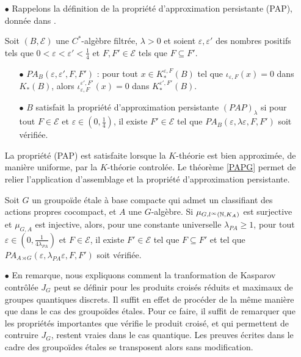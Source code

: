 \begin{itemize}

\item[$\bullet$] Rappelons la définition de la propriété d'approximation persistante (PAP), donnée dans \cite{OY3}.\\

\begin{definitionfr}
Soit $(B,\mathcal E)$ une $C^*$-algèbre filtrée, $\lambda>0$ et soient $\varepsilon,\varepsilon'$ des nombres positifs tels que $0<\varepsilon <\varepsilon' <\frac{1}{4}$ et $F,F'\in\mathcal E$ tels que $F\subseteq F'$. 
\begin{itemize}
\item[$\bullet$] $PA_B(\varepsilon,\varepsilon',F,F')$ : pour tout $x\in K_*^{\varepsilon,F}(B)$ tel que $\iota_{\varepsilon,F}(x)=0$ dans $K_*(B)$, alors $\iota_{\varepsilon,F}^{\varepsilon',F'}(x)=0$ dans $K_*^{\varepsilon',F'}(B)$.
\item[$\bullet$] $B$ satisfait la propriété d'approximation persistante $(PAP)_\lambda$ si pour tout $F\in\mathcal E$ et $\varepsilon\in (0,\frac{1}{4})$, il existe $F'\in\mathcal E$ tel que $PA_B(\varepsilon,\lambda\varepsilon,F,F')$ soit vérifiée.\\
\end{itemize}
\end{definitionfr}

La propriété (PAP) est satisfaite lorsque la $K$-théorie est bien approximée, de manière uniforme, par la $K$-théorie controlée. Le théorème \ref{PAPG} permet de relier l'application d'assemblage et la propriété d'approximation persistante. \\

\begin{thmfr} 
Soit $G$ un groupoïde étale à base compacte qui admet un classifiant des actions propres cocompact, et $A$ une $G$-algèbre. Si $\mu_{G,l^\infty(\mathbb N, K_A)}$ est surjective et $\mu_{G,A}$ est injective, alors, pour une constante universelle $\lambda_{PA}\geq 1$, pour tout $\varepsilon \in(0,\frac{1}{4\lambda_{PA}})$ et $F\in\mathcal E$, il existe $F'\in\mathcal E$ tel que $F\subseteq F'$ et tel que $PA_{A\rtimes G}(\varepsilon,\lambda_{PA}\varepsilon,F,F')$ soit vérifiée.\\
\end{thmfr}

\item[$\bullet$] En remarque, nous expliquons comment la tranformation de Kasparov contrôlée $J_G$ peut se définir pour les produits croisés réduits et maximaux de groupes quantiques discrets. Il suffit en effet de procéder de la même manière que dans le cas des groupoïdes étales. Pour ce faire, il suffit de remarquer que les propriétés importantes que vérifie le produit croisé, et qui permettent de contruire $J_G$, restent vraies dans le cas quantique. Les preuves écrites dans le cadre des groupoïdes étales se transposent alors sans modification.\\


\end{itemize}
